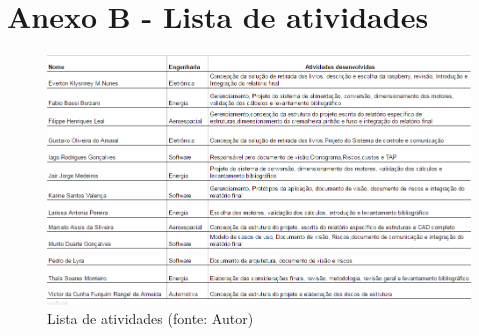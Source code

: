 \section{Anexo B - Lista de atividades}

\begin{figure}[!h]
\centering
\includegraphics[scale=0.65, angle = 360]{figuras/lista_atividades}
\caption[]{Lista de atividades (fonte: Autor)}
\label{Lista de atividades}
\end{figure}
\FloatBarrier